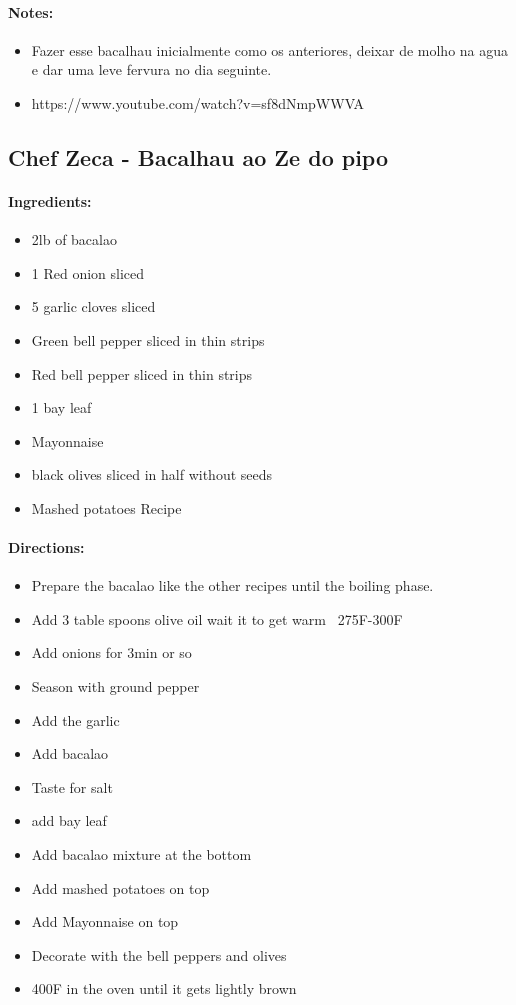 \documentclass{article}
\begin{document}
\paragraph{Notes:}
\begin{itemize}
    \item Fazer esse bacalhau inicialmente como os anteriores, deixar de molho na agua e dar uma leve fervura no dia seguinte.
    \item https://www.youtube.com/watch?v=sf8dNmpWWVA
\end{itemize}

\subsection{Chef Zeca - Bacalhau ao Ze do pipo}

\paragraph{Ingredients:}
\begin{itemize}
    \item 2lb of bacalao
    \item 1 Red onion sliced
    \item 5 garlic cloves sliced
    \item Green bell pepper sliced in thin strips
    \item Red bell pepper sliced in thin strips
    \item 1 bay leaf
    \item Mayonnaise
    \item black olives sliced in half without seeds
    \item Mashed potatoes Recipe
\end{itemize}

\paragraph{Directions:}
\begin{itemize}
    \item Prepare the bacalao like the other recipes until the boiling phase.
    \item Add 3 table spoons olive oil wait it to get warm ~275F-300F
    \item Add onions for 3min or so
    \item Season with ground pepper
    \item Add the garlic
    \item Add bacalao
    \item Taste for salt
    \item add bay leaf
    \item Add bacalao mixture at the bottom
    \item Add mashed potatoes on top
    \item Add Mayonnaise on top
    \item Decorate with the bell peppers and olives
    \item 400F in the oven until it gets lightly brown
\end{itemize}
\end{document}
